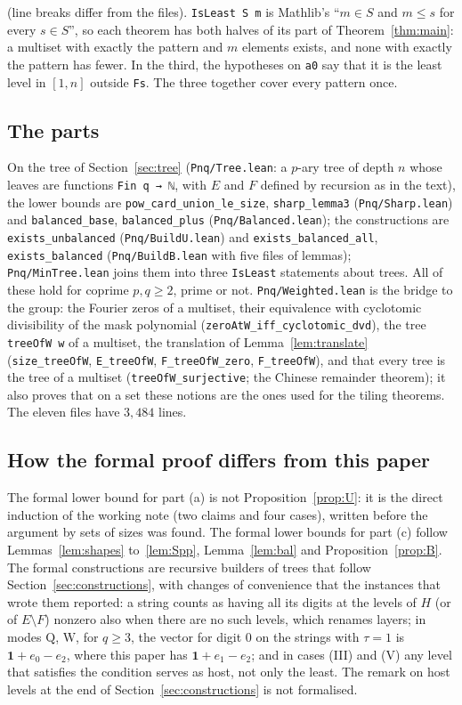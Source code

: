 \documentclass[11pt,a4paper]{amsart}
\theoremstyle{definition}
\theoremstyle{remark}
\newcommand{\one}{\mathbf{1}}
\newcommand{\lean}[1]{\texttt{#1}}
\begin{document}
\noindent (line breaks differ from the files). \lean{IsLeast S m} is Mathlib's ``$m\in S$ and $m\le s$ for
every $s\in S$'', so each theorem has both halves of its part of Theorem~\ref{thm:main}: a multiset with exactly
the pattern and $m$ elements exists, and none with exactly the pattern has fewer. In the third, the
hypotheses on \lean{a0} say that it is the least level in $[1,n]$ outside \lean{Fs}. The three together cover
every pattern once.

\subsection*{The parts} \sloppy On the tree of Section~\ref{sec:tree} (\lean{Pnq/Tree.lean}: a $p$-ary tree of depth
$n$ whose leaves are functions \lean{Fin q → ℕ}, with $E$ and $F$ defined by recursion as in the text), the
lower bounds are \lean{pow\_card\_union\_le\_size}, \lean{sharp\_lemma3} (\lean{Pnq/Sharp.lean}) and
\lean{balanced\_base}, \lean{balanced\_plus} (\lean{Pnq/Balanced.lean}); the constructions are
\lean{exists\_unbalanced} (\lean{Pnq/BuildU.lean}) and \lean{exists\_balanced\_all}, \lean{exists\_balanced}
(\lean{Pnq/BuildB.lean} with five files of lemmas); \lean{Pnq/MinTree.lean} joins them into three
\lean{IsLeast} statements about trees. All of these hold for coprime $p,q\ge2$, prime or not.
\lean{Pnq/Weighted.lean} is the bridge to the group: the Fourier zeros of a multiset, their equivalence with
cyclotomic divisibility of the mask polynomial (\lean{zeroAtW\_iff\_cyclotomic\_dvd}), the tree
\lean{treeOfW w} of a multiset, the translation of Lemma~\ref{lem:translate} (\lean{size\_treeOfW},
\lean{E\_treeOfW}, \lean{F\_treeOfW\_zero}, \lean{F\_treeOfW}), and that every tree is the tree of a
multiset (\lean{treeOfW\_surjective}; the Chinese remainder theorem); it also proves that on a set these
notions are the ones used for the tiling theorems. The eleven files have $3{,}484$ lines.

\subsection*{How the formal proof differs from this paper} The formal lower bound for part (a) is not
Proposition~\ref{prop:U}: it is the direct induction of the working note (two claims and four cases), written
before the argument by sets of sizes was found. The formal lower bounds for part (c) follow
Lemmas~\ref{lem:shapes} to~\ref{lem:Spp}, Lemma~\ref{lem:bal} and Proposition~\ref{prop:B}. The formal constructions are recursive
builders of trees that follow Section~\ref{sec:constructions}, with changes of convenience that the instances
that wrote them reported: a string counts as having all its digits at the levels of $H$ (or of
$E\setminus F$) nonzero also when there are no such levels, which renames layers; in modes $\mathrm Q$, $\mathrm W$, for $q\ge3$, the vector for digit $0$ on the strings with $\tau=1$ is
$\one+e_0-e_2$, where this paper has $\one+e_1-e_2$; and in cases (III) and (V) any level that satisfies the condition serves as host, not only the least. The remark on host levels at the end of
Section~\ref{sec:constructions} is not formalised.
\end{document}
